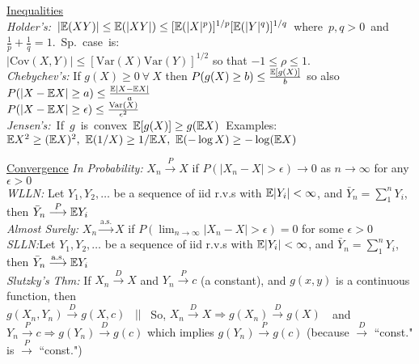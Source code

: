 \documentclass[11pt]{article}
\newcommand{\Var}{\ensuremath{\mathrm{Var}}}
\newcommand{\Cov}{\ensuremath{\mathrm{Cov}}}
\newcommand{\Exp}{\Bbb{E}}
\begin{document}
\indent\underline{Inequalities}\\
\mbox{{\it Holder's:} $|\Exp(XY)|\leq \Exp(|XY|) \leq [\Exp(|X|^p)]^{1/p} [\Exp(|Y|^q)]^{1/q}$ where $p,q >
0$ and $\frac{1}{p} + \frac{1}{q} = 1$.  Sp. case is:}\\
\hspace*{1.5em}{\it Cauchy-Schwarz:} $|\Cov(X,Y)| \leq
[\Var(X)\Var(Y)]^{1/2}$  so that
$-1\leq \rho \leq 1$.\\
{\it Chebychev's:} If $g(X)\geq 0\ \forall\ X$ then $P(g(X) \geq  b)\leq \frac{\Exp[g(X)]}{b}$
so also $P(|X-\Exp X|\geq a) \leq \frac{\Exp|X-\Exp X|}{a}$\\
\hspace*{1.5em}{\it Most Useful Form:} $P(|X-\Exp X|\geq \epsilon) \leq
\frac{\Var(X)}{\epsilon^2}$\\ 
\mbox{{\it Jensen's:} {\scriptsize If} $g$ {\scriptsize is convex}
$\Exp[g(X)] \geq g(\Exp X)$  {\footnotesize Examples: $\Exp X^2\geq (\Exp X)^2,\ \Exp(1/X) \geq 1/\Exp X,\
\Exp(-\log X)\geq -\log(\Exp X)$}}

\indent\underline{Convergence}
{\it In Probability:}  $X_n \stackrel{P}{\longrightarrow} X$ if $P(|X_n - X| > \epsilon)
\longrightarrow 0$ as $n\longrightarrow\infty$ for any $\epsilon > 0$\\
%
{\it WLLN:} Let $Y_1,Y_2,\ldots$ be a sequence of iid r.v.s with $\Exp|Y_i|<\infty $, and
$\bar{Y}_n = \sum_1^n Y_i$, then $\bar{Y}_n \stackrel{P}{\longrightarrow} \Exp Y_i$\\
%
{\it Almost Surely:} $X_n \stackrel{\mathrm{a.s.}}{\longrightarrow} X$ if
$P(\lim_{n\rightarrow\infty} |X_n - X| >\epsilon) = 0$ for some $\epsilon > 0$\\
% 
{\it SLLN:}Let $Y_1,Y_2,\ldots$ be a sequence of iid r.v.s with $\Exp|Y_i|<\infty $, and
$\bar{Y}_n = \sum_1^n Y_i$, then $\bar{Y}_n \stackrel{\mathrm{a.s.}}{\longrightarrow}
\Exp Y_i$\\
%
{\it Slutzky's Thm:} If $X_n \stackrel{D}{\longrightarrow} X$ and  $Y_n
\stackrel{P}{\longrightarrow} c$ (a constant), and $g(x,y)$ is a continuous function, then\\
\hspace*{1.5em}$g(X_n, Y_n) \stackrel{D}{\longrightarrow} g(X,c)$ \ $||$ \ So, $X_n
\stackrel{D}{\longrightarrow} X \Longrightarrow g(X_n)
\stackrel{D}{\longrightarrow} g(X)$\ \  and\\
\hspace*{1.5em}$Y_n \stackrel{P}{\longrightarrow} c \Longrightarrow  g(Y_n)
\stackrel{D}{\longrightarrow} g(c)$ which implies $g(Y_n)
\stackrel{P}{\longrightarrow} g(c)$ (because $\stackrel{D}{\longrightarrow}$ ``const." is
$\stackrel{P}{\longrightarrow}$ ``const.")
\end{document}
